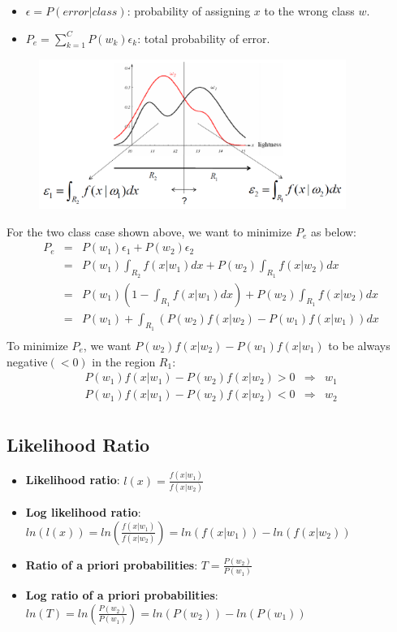 \documentclass[letterpaper,10pt]{article}
\begin{document}
\begin{itemize}
	\item $\epsilon=P(error|class)$: probability of assigning $x$ to the wrong class $w$.
	\item $P_e=\sum_{k=1}^{C}{P(w_k)\epsilon_k}$: total probability of error.
\end{itemize}
\begin{figure}[!ht]
	\centering
	\includegraphics[width=10cm]{./img/minimum_probability_of_error.png}
\end{figure}
For the two class case shown above, we want to minimize $P_e$ as below:
\begin{equation}
\begin{array}{rcl}
P_e & = & P(w_1)\epsilon_1 + P(w_2)\epsilon_2 \\
	& = & P(w_1)\int_{R_2}{f(x|w_1)dx} + P(w_2)\int_{R_1}{f(x|w_2)dx} \\
	& = & P(w_1)(1-\int_{R_1}{f(x|w_1)dx}) + P(w_2)\int_{R_1}{f(x|w_2)dx} \\
	& = & P(w_1) + \int_{R_1}{(P(w_2)f(x|w_2) - P(w_1)f(x|w_1))dx} \\ 
\end{array}
\end{equation}
To minimize $P_e$, we want $P(w_2)f(x|w_2) - P(w_1)f(x|w_1)$ to be always negative$(<0)$ in the region $R_1$:
\begin{equation}
\begin{array}{rcl}
P(w_1)f(x|w_1) - P(w_2)f(x|w_2) >0 & \Rightarrow & w_1 \\
P(w_1)f(x|w_1) - P(w_2)f(x|w_2) <0 & \Rightarrow & w_2 \\
\end{array}
\end{equation}

\subsection{Likelihood Ratio}

\begin{itemize}
	\item \textbf{Likelihood ratio}: $l(x)=\frac{f(x|w_1)}{f(x|w_2)}$
	\item \textbf{Log likelihood ratio}: $ln(l(x))=ln(\frac{f(x|w_1)}{f(x|w_2)})=ln(f(x|w_1))-ln(f(x|w_2))$
	\item \textbf{Ratio of a priori probabilities}: $T=\frac{P(w_2)}{P(w_1)}$
	\item \textbf{Log ratio of a priori probabilities}: $ln(T)=ln(\frac{P(w_2)}{P(w_1)})=ln(P(w_2))-ln(P(w_1))$
\end{itemize}
\end{document}
